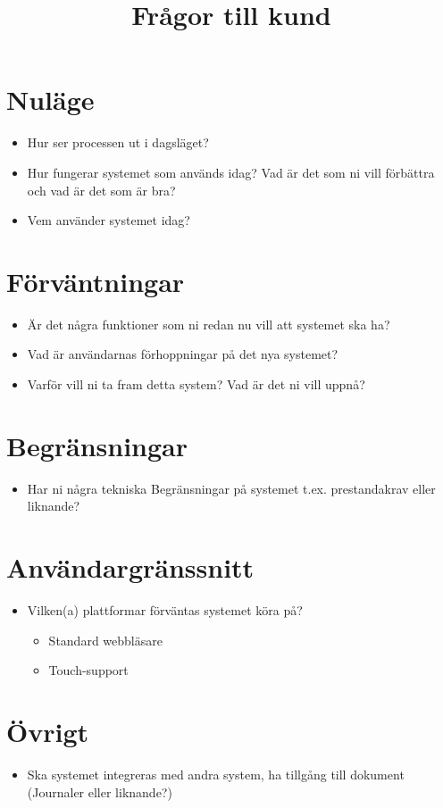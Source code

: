 \documentclass[a4paper,10pt]{article}
\title{Frågor till kund}
\author{}
\begin{document}
\section{Nuläge}
\begin{itemize}
    \item Hur ser processen ut i dagsläget?
    \item Hur fungerar systemet som används idag? Vad är det som ni vill förbättra och vad är det som är bra?
    \item Vem använder systemet idag?
\end{itemize}

\section{Förväntningar}
\begin{itemize}
    \item Är det några funktioner som ni redan nu vill att systemet ska ha?
    \item Vad är användarnas förhoppningar på det nya systemet?
    \item Varför vill ni ta fram detta system? Vad är det ni vill uppnå?
\end{itemize}

\section{Begränsningar}
\begin{itemize}
    \item Har ni några tekniska Begränsningar på systemet t.ex. prestandakrav eller liknande?
\end{itemize}
\section{Användargränssnitt}
\begin{itemize}
    \item Vilken(a) plattformar förväntas systemet köra på?
    \begin{itemize}
        \item Standard webbläsare
        \item Touch-support
    \end{itemize}
\end{itemize}
\section{Övrigt}
\begin{itemize}
    \item Ska systemet integreras med andra system, ha tillgång till dokument (Journaler eller liknande?)
\end{itemize}
\end{document}
